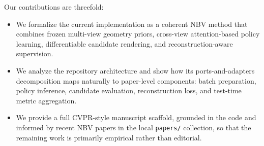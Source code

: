 Our contributions are threefold:
\begin{itemize}
    \item We formalize the current \codebase implementation as a coherent NBV method that combines frozen multi-view geometry priors, cross-view attention-based policy learning, differentiable candidate rendering, and reconstruction-aware supervision.
    \item We analyze the repository architecture and show how its ports-and-adapters decomposition maps naturally to paper-level components: batch preparation, policy inference, candidate evaluation, reconstruction loss, and test-time metric aggregation.
    \item We provide a full CVPR-style manuscript scaffold, grounded in the code and informed by recent NBV papers in the local \texttt{papers/} collection, so that the remaining work is primarily empirical rather than editorial.
\end{itemize}
